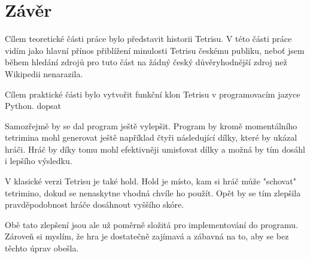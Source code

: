 \documentclass[12pt]{report}			%
\begin{document}
	\chapter*{Závěr}
Cílem teoretické části práce bylo představit historii Tetrisu.
V této části práce vidím jako hlavní přínos přiblížení minulosti Tetrisu českému publiku, neboť jsem během hledání zdrojů pro tuto část na žádný český důvěryhodnější zdroj než Wikipedii nenarazila.

Cílem praktické části bylo vytvořit funkční klon Tetrisu v programovacím jazyce Python.
dopsat

Samozřejmě by se dal program ještě vylepšit. Program by kromě momentálního tetrimina mohl generovat ještě například čtyři následující dílky, které by ukázal hráči. Hráč by díky tomu mohl efektivněji umisťovat dílky a možná by tím dosáhl i lepšího výsledku.

V klasické verzi Tetrisu je také hold. Hold je místo, kam si hráč může "schovat" tetrimino, dokud se nenaskytne vhodná chvíle ho použít. Opět by se tím zlepšila pravděpodobnost hráče dosáhnout vyššího skóre. 

Obě tato zlepšení jsou ale už poměrně složitá pro implementování do programu. Zároveň si myslím, že hra je dostatečně zajímavá a zábavná na to, aby se bez těchto úprav obešla. 
	
	
	\nocite{*}
    \printbibliography					%
    \printglossary[title={Zkratky}]		%
    \listoffigures						%
    \listoftables						%
\end{document}
